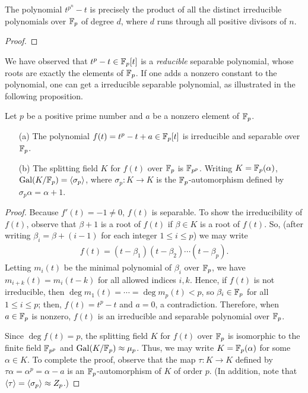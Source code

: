 \color{red}
\begin{prop}
    The polynomial $t^{p^n}-t$ is precisely the product of all the distinct irreducible polynomials over ${\mathbb{F}}_p$ of degree $d$, where $d$ runs through all positive divisors of $n$.
\end{prop}
\begin{proof}
    
\end{proof}
\color{black}

We have observed that $t^p-t\in{\mathbb{F}}_p[t]$ is a \textit{reducible} separable polynomial, whose roots are exactly the elements of ${\mathbb{F}}_p$.
If one adds a nonzero constant to the polynomial, one can get a irreducible separable polynomial, as illustrated in the following proposition.
\begin{prop}
    Let $p$ be a positive prime number and $a$ be a nonzero element of ${\mathbb{F}}_p$.
    \begin{enumerate}
        \item[(a)]
        {
            The polynomial $f(t)=t^p-t+a\in{\mathbb{F}}_p[t]$ is irreducible and separable over ${\mathbb{F}}_p$.
        }
        \item[(b)]
        {
            The splitting field $K$ for $f(t)$ over ${\mathbb{F}}_p$ is ${\mathbb{F}}_{p^p}$.
            Writing $K={\mathbb{F}}_p(\alpha)$, ${\textrm{Gal}({K/{\mathbb{F}}_p})}={\left\langle{\sigma_p}\right\rangle}$, where $\sigma_p: K\rightarrow K$ is the ${\mathbb{F}}_p$-automorphism defined by $\sigma_p\alpha=\alpha+1$.
        }
    \end{enumerate}
\end{prop}
\begin{proof}
    Because $f'(t)=-1\neq 0$, $f(t)$ is separable.
    To show the irreducibility of $f(t)$, observe that $\beta+1$ is a root of $f(t)$ if $\beta\in K$ is a root of $f(t)$.
    So, (after writing $\beta_i=\beta+(i-1)$ for each integer $1\leq i\leq p$) we may write
    \begin{align*}
        f(t)=(t-\beta_1)(t-\beta_2)\cdots(t-\beta_p).
    \end{align*}
    Letting $m_i(t)$ be the minimal polynomial of $\beta_i$ over ${\mathbb{F}}_p$, we have $m_{i+k}(t)=m_i(t-k)$ for all allowed indices $i, k$.
    Hence, if $f(t)$ is not irreducible, then $\deg m_1(t)=\cdots=\deg m_p(t)<p$, so $\beta_i\in{\mathbb{F}}_p$ for all $1\leq i\leq p$; then, $f(t)=t^p-t$ and $a=0$, a contradiction.
    Therefore, when $a\in{\mathbb{F}}_p$ is nonzero, $f(t)$ is an irreducible and separable polynomial over ${\mathbb{F}}_p$.

    Since $\deg f(t)=p$, the splitting field $K$ for $f(t)$ over ${\mathbb{F}}_p$ is isomorphic to the finite field ${\mathbb{F}}_{p^p}$ and ${\textrm{Gal}({K/{\mathbb{F}}_p})}\approx\mu_p$.
    Thus, we may write $K={\mathbb{F}}_p(\alpha)$ for some $\alpha\in K$.
    To complete the proof, observe that the map $\tau: K\rightarrow K$ defined by $\tau\alpha=\alpha^p=\alpha-a$ is an ${\mathbb{F}}_p$-automorphism of $K$ of order $p$.
    (In addition, note that ${\left\langle{\tau}\right\rangle}={\left\langle{\sigma_p}\right\rangle}\approx Z_p$.)
\end{proof}
